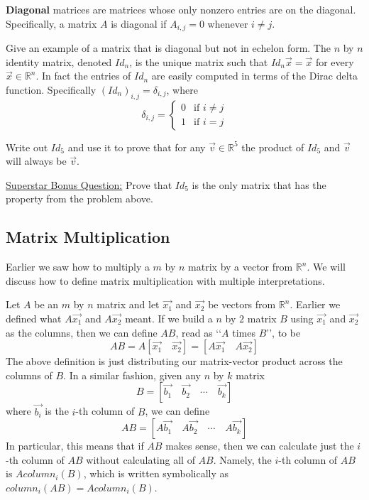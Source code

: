 \textbf{Diagonal} matrices are matrices whose only nonzero entries are on the diagonal. Specifically, a matrix $A$ is diagonal if $A_{i,j}=0$ whenever $i \neq j$.

\bq Give an example of a matrix that is diagonal but not in echelon form.
\eq
The $n$ by $n$ identity matrix, denoted $Id_n$, is the unique matrix such that $Id_n \vec{x}= \vec{x}$ for every $\vec{x} \in \mathbb{R}^n$. In fact the entries of $Id_n$ are easily computed in terms of the Dirac delta function. Specifically $(Id_n)_{i,j}=\delta_{i,j}$, where $$\delta_{i,j}=\left\{ \begin{array}{cc} 0 & \mbox{if }i\neq j\\ 1 & \mbox{if } i = j \end{array} \right. $$

\bq Write out $Id_5$ and use it to prove that for any $\vec{v} \in \mathbb{R}^5$ the product of $Id_5$ and $\vec{v}$ will always be $\vec{v}$.
\eq

\bq \underline{Superstar Bonus Question:} Prove that $Id_5$ is the only matrix that has the property from the problem above.
\begin{annotation}
\end{annotation}
\eq

\subsection{Matrix Multiplication}
Earlier we saw how to multiply a $m$ by $n$ matrix by a vector from $\mathbb{R}^n$. We will discuss how to define matrix multiplication with multiple interpretations.

Let $A$ be an $m$ by $n$ matrix and let $\vec{x_1}$ and $\vec{x_2}$ be vectors from $\mathbb{R}^n$. Earlier we defined what $A\vec{x_1}$ and $A\vec{x_2}$ meant. If we build a $n$ by $2$ matrix $B$ using $\vec{x_1}$ and $\vec{x_2}$ as the columns, then we can define $AB$, read as \lq\lq{$A$ times $B$}\rq\rq, to be $$AB=A [\vec{x_1} \quad \vec{x_2}]=[A\vec{x_1} \quad A\vec{x_2}]$$
The above definition is just distributing our matrix-vector product across the columns of $B$. In a similar fashion, given any $n$ by $k$ matrix $$B=[\vec{b_1} \quad  \vec{b_2}  \quad \cdots \quad  \vec{b_k}]$$
where $\vec{b_i}$ is the $i$-th column of $B$, we can define
$$AB=[A\vec{b_1}  \quad A\vec{b_2}  \quad \cdots  \quad A\vec{b_k}]$$
In particular, this means that if $AB$ makes sense, then we can calculate just the $i$-th column of $AB$ without calculating all of $AB$. Namely, the $i$-th column of $AB$ is $A column_i(B)$, which is written symbolically as $column_i(AB)=A column_i(B)$.

